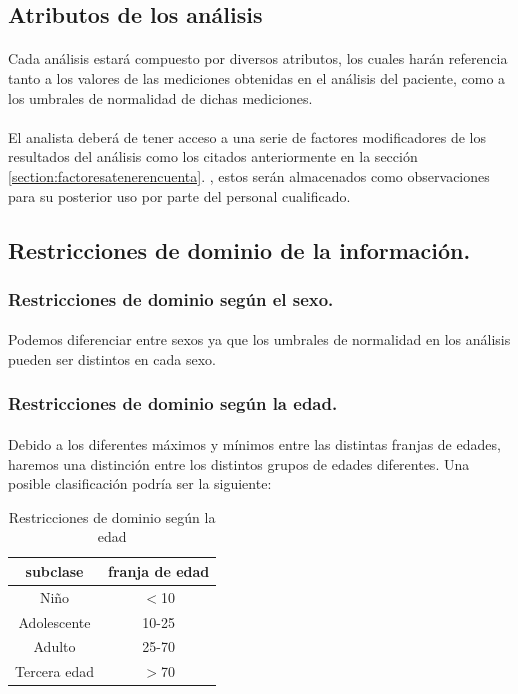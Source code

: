 \documentclass[a4paper,10pt]{article}
\begin{document}
\subsection{Atributos de los análisis}
\paragraph{}
Cada análisis estará compuesto por diversos atributos, los cuales harán referencia tanto a los valores de las mediciones obtenidas en el análisis del paciente, como a los umbrales de normalidad de dichas mediciones.
\paragraph{}
El analista deberá de tener acceso a una serie de factores modificadores de los resultados del análisis como los citados anteriormente en la sección \ref{section:factoresatenerencuenta}. , estos serán almacenados como observaciones para su posterior uso por parte del personal cualificado.

\pagebreak
\subsection{Restricciones de dominio de la información.}
\subsubsection{Restricciones de dominio según el sexo.}
\paragraph{}
Podemos diferenciar entre sexos ya que los umbrales de normalidad en los análisis pueden ser distintos en cada sexo.

\subsubsection{Restricciones de dominio según la edad.}
\paragraph{}
Debido a los diferentes máximos y mínimos entre las distintas franjas de edades, haremos una distinción entre los distintos grupos de edades diferentes. Una posible clasificación podría ser la siguiente:
\begin{table}[hbt]
		\begin{center}
		\begin{tabular}{|c|c|}\hline
			subclase & franja de edad \\ \hline
			Niño & $<$10 \\ \hline
			Adolescente & 10-25 \\ \hline
			Adulto & 25-70 \\ \hline
			Tercera edad & $>$70 \\ \hline
		\end{tabular}
		\caption{Restricciones de dominio según la edad}
	\end{center}
\end{table}
\end{document}
